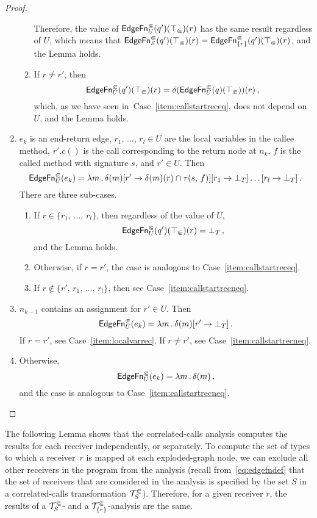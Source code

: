 \begin{proof}
\begin{enumerate}
\begin{enumerate}
        Therefore, the value of $\textsf{EdgeFn}^\Subset_{U}(q')(\top_\Subset)(r)$ has the same result regardless of $U$,
        which means that $\textsf{EdgeFn}^\Subset_{S}(q')(\top_\Subset)(r)=\textsf{EdgeFn}^\Subset_{\{r\}}(q')(\top_\Subset)(r)$, and the Lemma holds.
      \item\label{item:callstartrecneq} If $r\ne r'$, then
        \begin{equation}
          \textsf{EdgeFn}^\Subset_{U}(q')(\top_\Subset)(r)=\delta(\textsf{EdgeFn}^\Subset_{U}(q)(\top_\Subset))(r)\,,
        \end{equation}
        which, as we have seen in~Case~\eqref{item:callstartreceq}, does not depend on~$U$, and the Lemma holds.
    \end{enumerate}
    \item $e_k$ is an end-return edge, $r_1,\,\dots,\,r_l\in U$ are the local variables in the callee method, $r'.c()$ is the call corresponding to the return node at $n_k$, $f$ is the called method with signature $s$, and $r'\in U$.
    Then
    \[
      \textsf{EdgeFn}^\Subset_{U}(e_k)=\lambda m\,.\,\delta(m)
      [r'\to\delta(m)(r)\cap\tau(s,\,f)]
      [r_1\to\bot_T]\ldots[r_l\to\bot_T]\,.
    \]
    There are three sub-cases.
    \begin{enumerate}
      \item\label{item:localvarrec} If $r\in\{r_1,\,\dots,\,r_l\}$, then regardless of the value of $U$,
      \[
        \textsf{EdgeFn}^\Subset_{U}(q')(\top_\Subset)(r)=\bot_T\,,
      \]
      and the Lemma holds.
      \item Otherwise, if $r=r'$, the case is analogous to Case~\eqref{item:callstartreceq}.
      \item If $r\notin\{r',\,r_1,\,\dots,\,r_l\}$, then see Case~\eqref{item:callstartrecneq}.
    \end{enumerate}
    \item $n_{k-1}$ contains an assignment for $r'\in U$. Then
    \[
      \textsf{EdgeFn}^\Subset_{U}(e_k)=\lambda m\,.\,\delta(m)[r'\to\bot_T]\,.
    \]
    If $r=r'$, see Case~\eqref{item:localvarrec}. If $r\ne r'$, see Case~\eqref{item:callstartrecneq}.
    \item Otherwise,
    \[
      \textsf{EdgeFn}^\Subset_{U}(e_k)=\lambda m\,.\,\delta(m)\,,
    \]
    and the case is analogous to Case~\eqref{item:callstartrecneq}.\qedhere
  \end{enumerate}
\end{proof}

The following Lemma shows that the correlated-calls analysis computes the results for each receiver independently, or separately. To compute the set of types to which a receiver~$r$ is mapped at each exploded-graph node, we can exclude all other receivers in the program from the analysis (recall from~\eqref{eq:edgefndef} that the set of receivers that are considered in the analysis is specified by the set $S$ in a correlated-calls transformation $\mathcal T^\Subset_S$). Therefore, for a given receiver $r$, the results of a $\mathcal T^\Subset_S$- and a $\mathcal T^\Subset_{\{r\}}$-analysis are the same.

